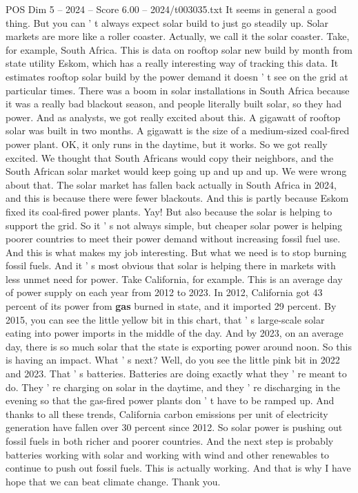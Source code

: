 \begin{textsample}{POS Dim 5 – 2024 – Score 6.00 – 2024/t003035.txt}
It seems in general a good thing.
But you can ' t always expect solar build to just go steadily up.
Solar markets are more like a roller coaster.
Actually, we call it the solar coaster.
Take, for example, South Africa.
This is data on rooftop solar new build by month from state utility Eskom, which has a really interesting way of tracking this data.
It estimates rooftop solar build by the power demand it doesn ' t see on the grid at particular times.
There was a boom in solar installations in South Africa because it was a really bad blackout season, and people literally built solar, so they had power.
And as analysts, we got really excited about this.
A gigawatt of rooftop solar was built in two months.
A gigawatt is the size of a medium-sized coal-fired power plant.
OK, it only runs in the daytime, but it works.
So we got really excited.
We thought that South Africans would copy their neighbors, and the South African solar market would keep going up and up and up.
We were wrong about that.
The solar market has fallen back actually in South Africa in 2024, and this is because there were fewer blackouts.
And this is partly because Eskom fixed its coal-fired power plants.
Yay!
But also because the solar is helping to support the grid.
So it ' s not always simple, but cheaper solar power is helping poorer countries to meet their power demand without increasing fossil fuel use.
And this is what makes my job interesting.
But what we need is to stop burning fossil fuels.
And it ' s most obvious that solar is helping there in markets with less unmet need for power.
Take California, for example.
This is an average day of power supply on each year from 2012 to 2023.
In 2012, California got 43 percent of its power from \textbf{gas} burned in state, and it imported 29 percent.
By 2015, you can see the little yellow bit in this chart, that ' s large-scale solar eating into power imports in the middle of the day.
And by 2023, on an average day, there is so much solar that the state is exporting power around noon.
So this is having an impact.
What ' s next?
Well, do you see the little pink bit in 2022 and 2023.
That ' s batteries.
Batteries are doing exactly what they ' re meant to do.
They ' re charging on solar in the daytime, and they ' re discharging in the evening so that the gas-fired power plants don ' t have to be ramped up.
And thanks to all these trends, California carbon emissions per unit of electricity generation have fallen over 30 percent since 2012.
So solar power is pushing out fossil fuels in both richer and poorer countries.
And the next step is probably batteries working with solar and working with wind and other renewables to continue to push out fossil fuels.
This is actually working.
And that is why I have hope that we can beat climate change.
Thank you.

\end{textsample}
